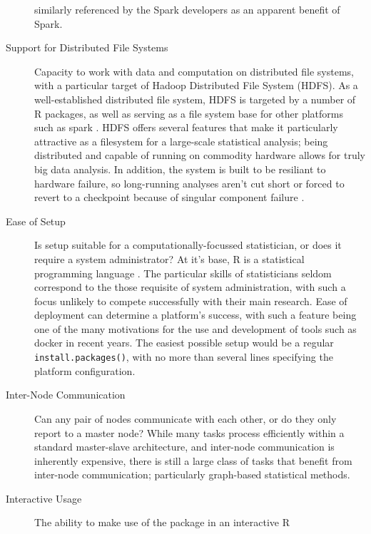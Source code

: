 \documentclass[a4paper,10pt]{article}
\begin{document}
\begin{description}
      similarly referenced by the Spark developers as an
      apparent benefit of Spark\cite{zaharia2010spark}.
\item[Support for Distributed File Systems]
      Capacity to work with data and computation on distributed file
      systems, with a particular target of Hadoop Distributed File System
      (HDFS).
      As a well-established distributed file system, HDFS is targeted
      by a number of R packages, as well as serving as a file
      system base for other platforms such as spark
      \cite{analytics:_rhadoop_wiki} \cite{deltarho:_rhipe}
      \cite{urbanek20} \cite{zaharia2016apache}.
      HDFS offers several features that make it particularly
      attractive as a filesystem for a large-scale statistical
      analysis;
      being distributed and capable of running on commodity hardware
      allows for truly big data analysis.
      In addition, the system is built to be resiliant to hardware
      failure, so long-running analyses aren't cut short or forced to
      revert to a checkpoint because of singular component failure
      \cite{shvachko2010hadoop}.
\item[Ease of Setup]
      Is setup suitable for a computationally-focussed
      statistician, or does it require a system administrator?
      At it's base, R is a statistical programming language
      \cite{rcore2020intro}.
      The particular skills of statisticians seldom correspond to the
      those requisite of system administration, with such a focus
      unlikely to compete successfully with their main research.
      Ease of deployment can determine a platform's success, with
      such a feature being one of the many motivations for the use
      and development of tools such as docker in recent years.
      The easiest possible setup would be a regular
      \texttt{install.packages()}, with no more than several lines
      specifying the platform configuration.
\item[Inter-Node Communication]
      Can any pair of nodes communicate with each other, or do they
      only report to a master node?
      While many tasks process efficiently within a standard
      master-slave architecture, and inter-node communication is
      inherently expensive, there is still a large class of tasks
      that benefit from inter-node communication\cite{walker1996mpi};
      particularly graph-based statistical methods.
\item[Interactive Usage]
      The ability to make use of the package in an interactive R

\end{description}
\end{document}
